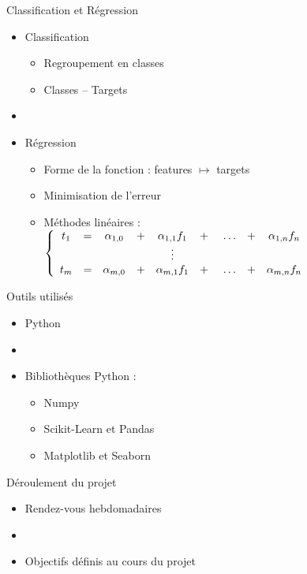 \documentclass{beamer}
\begin{document}
\begin{frame}{Classification et Régression}
  \begin{itemize}
    \item Classification
    \begin{itemize}
      \item Regroupement en classes
      \item Classes -- Targets
    \end{itemize}
    \item[]
    \item Régression
    \begin{itemize}
      \item Forme de la fonction : features $\mapsto$ targets
      \item Minimisation de l'erreur
      \item Méthodes linéaires :
      \begin{math}
        \left\{
        \begin{array}{c c c c c cccc}
          t_1 &=& \alpha_{1,0} &+& \alpha_{1,1}f_1 &+& \dots &+& \alpha_{1,n}f_n\\
          &&&&\vdots\\
          t_m &=& \alpha_{m,0} &+& \alpha_{m,1}f_1 &+& \dots &+& \alpha_{m,n}f_n
        \end{array}
        \right.
      \end{math}
    \end{itemize}
  \end{itemize}
\end{frame}

\begin{frame}{Outils utilisés}
  \begin{itemize}
    \item Python
    \item[]
    \item Bibliothèques Python :
    \begin{itemize}
      \item Numpy
      \item Scikit-Learn et Pandas
      \item Matplotlib et Seaborn
    \end{itemize}
  \end{itemize}
\end{frame}

\begin{frame}{Déroulement du projet}
  \begin{itemize}
    \item Rendez-vous hebdomadaires
    \item[]
    \item Objectifs définis au cours du projet
  \end{itemize}
\end{frame}
\end{document}
